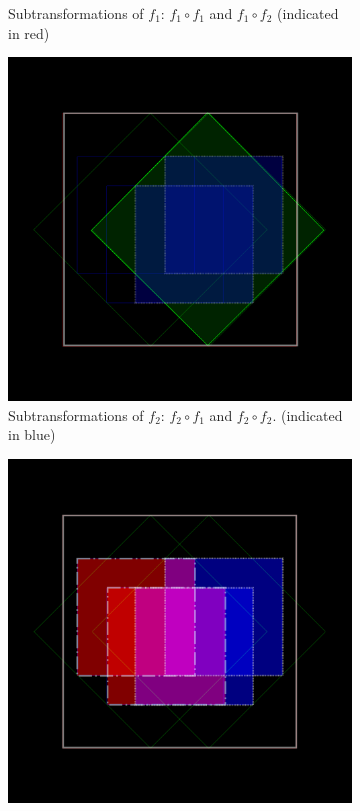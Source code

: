 \documentclass[11pt]{article}
\begin{document}
\begin{enumerate}
\begin{figure}
\begin{subfigure}[b]{0.4\textwidth}
         \caption{Subtransformations of $f_1$: $f_1 \circ f_1$ and $f_1 \circ f_2$ (indicated in red)}
         \label{figure:dragon_curve_b}
     \end{subfigure}
     \hfill
     \begin{subfigure}[b]{0.4\textwidth}
         \centering
         \includegraphics[width=\textwidth]{figures/dragon_curve_c}
         \caption{Subtransformations of $f_2$: $f_2 \circ f_1$ and $f_2 \circ f_2$. (indicated in blue)}
         \label{figure:dragon_curve_c}
     \end{subfigure}
     \hfill
     \begin{subfigure}[b]{0.4\textwidth}
         \centering
         \includegraphics[width=\textwidth]{figures/dragon_curve_d}

\end{subfigure}
\end{figure}
\end{enumerate}
\end{document}
